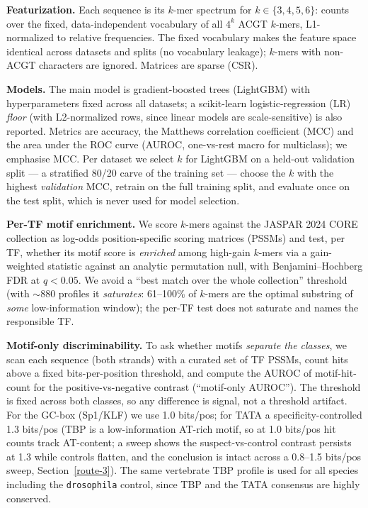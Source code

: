 \documentclass{ws-procs11x85}
\begin{document}
\textbf{Featurization.} Each sequence is its $k$-mer spectrum for $k\in\{3,4,5,6\}$: counts over the
fixed, data-independent vocabulary of all $4^k$ ACGT $k$-mers, L1-normalized to relative frequencies. The
fixed vocabulary makes the feature space identical across datasets and splits (no vocabulary leakage);
$k$-mers with non-ACGT characters are ignored. Matrices are sparse (CSR).

\textbf{Models.} The main model is gradient-boosted trees (LightGBM\cite{lightgbm}) with hyperparameters
fixed across all datasets; a scikit-learn\cite{sklearn} logistic-regression (LR) \emph{floor} (with L2-normalized rows, since linear
models are scale-sensitive) is also reported. Metrics are accuracy, the Matthews correlation coefficient
(MCC)\cite{mcc} and the area under the ROC curve (AUROC, one-vs-rest macro for multiclass); we emphasise
MCC. Per dataset we select $k$ for LightGBM on a held-out validation split --- a stratified 80/20 carve of
the training set --- choose the $k$ with the highest \emph{validation} MCC, retrain on the full training
split, and evaluate once on the test split, which is never used for model selection.

\textbf{Per-TF motif enrichment.} We score $k$-mers against the JASPAR 2024 CORE collection\cite{jaspar,pyjaspar}
as log-odds position-specific scoring matrices (PSSMs) and test, per TF, whether its motif score is
\emph{enriched} among high-gain $k$-mers via a gain-weighted statistic against an analytic permutation
null, with Benjamini--Hochberg FDR\cite{bh} at $q<0.05$. We avoid a ``best match over the whole
collection'' threshold (with $\sim$880 profiles it \emph{saturates}: 61--100\% of $k$-mers are the optimal
substring of \emph{some} low-information window); the per-TF test does not saturate and names the
responsible TF.

\textbf{Motif-only discriminability.} To ask whether motifs \emph{separate the classes}, we scan each
sequence (both strands) with a curated set of TF PSSMs, count hits above a fixed bits-per-position
threshold, and compute the AUROC of motif-hit-count for the positive-vs-negative contrast (``motif-only
AUROC''). The threshold is fixed across both classes, so any difference is signal, not a threshold
artifact. For the GC-box (Sp1/KLF) we use 1.0 bits/pos; for TATA a specificity-controlled 1.3 bits/pos
(TBP is a low-information AT-rich motif, so at 1.0 bits/pos hit counts track AT-content; a sweep shows the
suspect-vs-control contrast persists at 1.3 while controls flatten, and the conclusion is intact across a
0.8--1.5 bits/pos sweep, Section~\ref{route-3}). The same vertebrate TBP profile is used for all species
including the \texttt{drosophila} control, since TBP and the TATA consensus are highly conserved.
\end{document}

